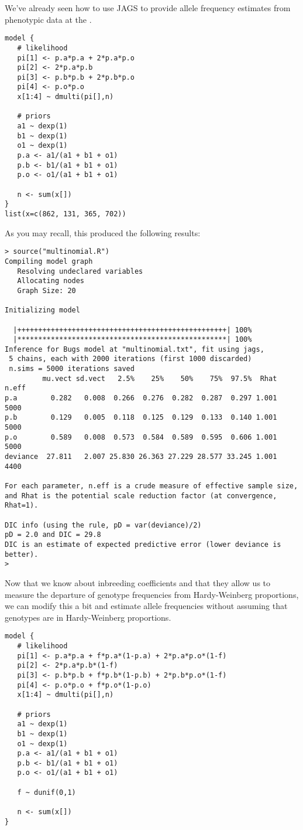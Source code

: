 \documentclass[12pt]{article}
\begin{document}
We've already seen how to use JAGS to provide allele frequency
estimates from phenotypic data at the .
\begin{verbatim}
model {
   # likelihood
   pi[1] <- p.a*p.a + 2*p.a*p.o
   pi[2] <- 2*p.a*p.b
   pi[3] <- p.b*p.b + 2*p.b*p.o
   pi[4] <- p.o*p.o
   x[1:4] ~ dmulti(pi[],n)

   # priors
   a1 ~ dexp(1)
   b1 ~ dexp(1)
   o1 ~ dexp(1)
   p.a <- a1/(a1 + b1 + o1)
   p.b <- b1/(a1 + b1 + o1)
   p.o <- o1/(a1 + b1 + o1)

   n <- sum(x[])
}
list(x=c(862, 131, 365, 702))
\end{verbatim}
As you may recall, this produced the following results:
\begin{verbatim}
> source("multinomial.R")
Compiling model graph
   Resolving undeclared variables
   Allocating nodes
   Graph Size: 20

Initializing model

  |++++++++++++++++++++++++++++++++++++++++++++++++++| 100%
  |**************************************************| 100%
Inference for Bugs model at "multinomial.txt", fit using jags,
 5 chains, each with 2000 iterations (first 1000 discarded)
 n.sims = 5000 iterations saved
         mu.vect sd.vect   2.5%    25%    50%    75%  97.5%  Rhat n.eff
p.a        0.282   0.008  0.266  0.276  0.282  0.287  0.297 1.001  5000
p.b        0.129   0.005  0.118  0.125  0.129  0.133  0.140 1.001  5000
p.o        0.589   0.008  0.573  0.584  0.589  0.595  0.606 1.001  5000
deviance  27.811   2.007 25.830 26.363 27.229 28.577 33.245 1.001  4400

For each parameter, n.eff is a crude measure of effective sample size,
and Rhat is the potential scale reduction factor (at convergence, Rhat=1).

DIC info (using the rule, pD = var(deviance)/2)
pD = 2.0 and DIC = 29.8
DIC is an estimate of expected predictive error (lower deviance is better).
>
\end{verbatim}
Now that we know about inbreeding coefficients and that they allow us
to measure the departure of genotype frequencies from Hardy-Weinberg
proportions, we can modify this a bit and estimate allele frequencies
without assuming that genotypes are in Hardy-Weinberg proportions.
\begin{verbatim}
model {
   # likelihood
   pi[1] <- p.a*p.a + f*p.a*(1-p.a) + 2*p.a*p.o*(1-f)
   pi[2] <- 2*p.a*p.b*(1-f)
   pi[3] <- p.b*p.b + f*p.b*(1-p.b) + 2*p.b*p.o*(1-f)
   pi[4] <- p.o*p.o + f*p.o*(1-p.o)
   x[1:4] ~ dmulti(pi[],n)

   # priors
   a1 ~ dexp(1)
   b1 ~ dexp(1)
   o1 ~ dexp(1)
   p.a <- a1/(a1 + b1 + o1)
   p.b <- b1/(a1 + b1 + o1)
   p.o <- o1/(a1 + b1 + o1)

   f ~ dunif(0,1)

   n <- sum(x[])
}
\end{verbatim}
\end{document}
